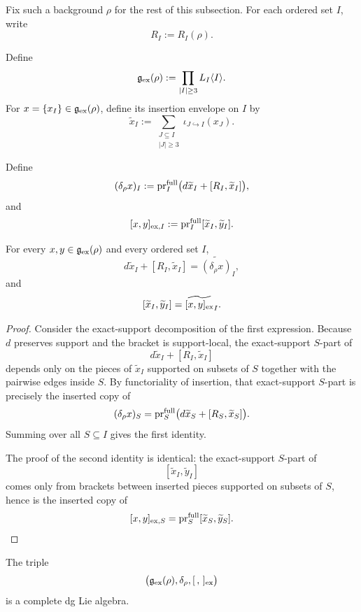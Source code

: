 Fix such a background $\rho$ for the rest of this subsection. For each ordered set $I$, write
\[
R_I:=R_I(\rho).
\]

\begin{definition}
\label{def:exact-support-deformation-dg-Lie-algebra}
Define
\[
\mathfrak g_{\mathrm{ex}}(\rho)
:=
\prod_{|I|\ge 3}L_I\langle I\rangle.
\]
For $x=\{x_I\}\in \mathfrak g_{\mathrm{ex}}(\rho)$, define its insertion envelope on $I$ by
\[
\widetilde x_I
:=
\sum_{\substack{J\subseteq I\\ |J|\ge 3}}
\iota_{J\hookrightarrow I}(x_J).
\]

Define
\[
(\delta_\rho x)_I
:=
\operatorname{pr}_I^{\mathrm{full}}\bigl(d\widetilde x_I+[R_I,\widetilde x_I]\bigr),
\]
and
\[
[x,y]_{\mathrm{ex},I}
:=
\operatorname{pr}_I^{\mathrm{full}}[\widetilde x_I,\widetilde y_I].
\]
\end{definition}

\begin{lemma}
\label{lem:support-envelope-descent}
For every $x,y\in \mathfrak g_{\mathrm{ex}}(\rho)$ and every ordered set $I$,
\[
d\widetilde x_I+[R_I,\widetilde x_I]
=
\widetilde{(\delta_\rho x)}_I,
\]
and
\[
[\widetilde x_I,\widetilde y_I]
=
\widetilde{[x,y]_{\mathrm{ex}}}_I.
\]
\end{lemma}

\begin{proof}
Consider the exact-support decomposition of the first expression. Because $d$ preserves support and
the bracket is support-local, the exact-support $S$-part of
\[
d\widetilde x_I+[R_I,\widetilde x_I]
\]
depends only on the pieces of $\widetilde x_I$ supported on subsets of $S$ together with the pairwise
edges inside $S$. By functoriality of insertion, that exact-support $S$-part is precisely the inserted copy of
\[
(\delta_\rho x)_S
=
\operatorname{pr}_S^{\mathrm{full}}\bigl(d\widetilde x_S+[R_S,\widetilde x_S]\bigr).
\]
Summing over all $S\subseteq I$ gives the first identity.

The proof of the second identity is identical:
the exact-support $S$-part of
\[
[\widetilde x_I,\widetilde y_I]
\]
comes only from brackets between inserted pieces supported on subsets of $S$, hence is the inserted copy
of
\[
[x,y]_{\mathrm{ex},S}
=
\operatorname{pr}_S^{\mathrm{full}}[\widetilde x_S,\widetilde y_S].
\]
\end{proof}

\begin{theorem}
\label{thm:exact-support-dg-Lie-algebra}
The triple
\[
\bigl(\mathfrak g_{\mathrm{ex}}(\rho),\delta_\rho,[\, ,\,]_{\mathrm{ex}}\bigr)
\]
is a complete dg Lie algebra.
\end{theorem}


